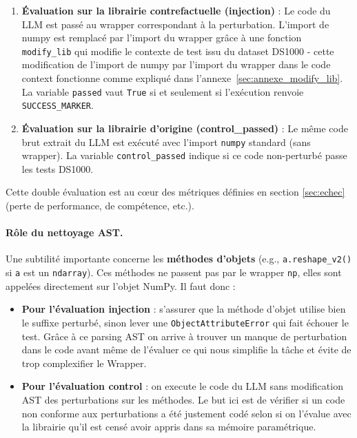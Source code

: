 \documentclass[11pt, a4paper]{article}
\begin{document}
\begin{enumerate}
    \item \textbf{Évaluation sur la librairie contrefactuelle (injection)} : Le code du LLM est passé au wrapper correspondant à la perturbation. L'import de numpy est remplacé par l'import du wrapper grâce à une fonction \texttt{modify\_lib} qui modifie le contexte de test issu du dataset DS1000 - cette modification de l'import de numpy par l'import du wrapper dans le code context fonctionne comme expliqué dans l'annexe~\ref{sec:annexe_modify_lib}. La variable \texttt{passed} vaut \texttt{True} si et seulement si l'exécution renvoie \texttt{SUCCESS\_MARKER}.

    \item \textbf{Évaluation sur la librairie d'origine (control\_passed)} : Le même code brut extrait du LLM est exécuté avec l'import \texttt{numpy} standard (sans wrapper). La variable \texttt{control\_passed} indique si ce code non-perturbé passe les tests DS1000.
\end{enumerate}

Cette double évaluation est au cœur des métriques définies en section \ref{sec:echec} (perte de performance, de compétence, etc.).

\paragraph{Rôle du nettoyage AST.}
Une subtilité importante concerne les \textbf{méthodes d'objets} (e.g., \texttt{a.reshape\_v2()} si \texttt{a} est un \texttt{ndarray}). Ces méthodes ne passent pas par le wrapper \texttt{np}, elles sont appelées directement sur l'objet NumPy. Il faut donc :

\begin{itemize}
    \item \textbf{Pour l'évaluation injection} : s'assurer que la méthode d'objet utilise bien le suffixe perturbé, sinon lever une \texttt{ObjectAttributeError} qui fait échouer le test. Grâce à ce parsing AST on arrive à trouver un manque de perturbation dans le code avant même de l'évaluer ce qui nous simplifie la tâche et évite de trop complexifier le Wrapper.
    \item \textbf{Pour l'évaluation control} : on execute le code du LLM sans modification AST des perturbations sur les méthodes. Le but ici est de vérifier si un code non conforme aux perturbations a été justement codé selon si on l'évalue avec la librairie qu'il est censé avoir appris dans sa mémoire paramétrique.
\end{itemize}
\end{document}
